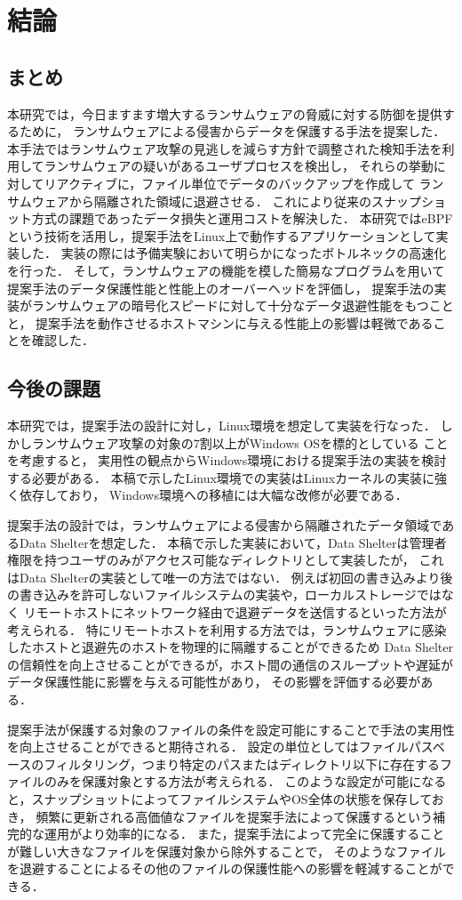 \chapter{結論}
\section{まとめ}
本研究では，今日ますます増大するランサムウェアの脅威に対する防御を提供するために，
ランサムウェアによる侵害からデータを保護する手法を提案した．
本手法ではランサムウェア攻撃の見逃しを減らす方針で調整された検知手法を利用してランサムウェアの疑いがあるユーザプロセスを検出し，
それらの挙動に対してリアクティブに，ファイル単位でデータのバックアップを作成して
ランサムウェアから隔離された領域に退避させる．
これにより従来のスナップショット方式の課題であったデータ損失と運用コストを解決した．
本研究ではeBPFという技術を活用し，提案手法をLinux上で動作するアプリケーションとして実装した．
実装の際には予備実験において明らかになったボトルネックの高速化を行った．
そして，ランサムウェアの機能を模した簡易なプログラムを用いて提案手法のデータ保護性能と性能上のオーバーヘッドを評価し，
提案手法の実装がランサムウェアの暗号化スピードに対して十分なデータ退避性能をもつことと，
提案手法を動作させるホストマシンに与える性能上の影響は軽微であることを確認した．

\section{今後の課題}
本研究では，提案手法の設計に対し，Linux環境を想定して実装を行なった．
しかしランサムウェア攻撃の対象の7割以上がWindows OSを標的としている \cite{trendmicro-report} ことを考慮すると，
実用性の観点からWindows環境における提案手法の実装を検討する必要がある．
本稿で示したLinux環境での実装はLinuxカーネルの実装に強く依存しており，
Windows環境への移植には大幅な改修が必要である．

提案手法の設計では，ランサムウェアによる侵害から隔離されたデータ領域であるData Shelterを想定した．
本稿で示した実装において，Data Shelterは管理者権限を持つユーザのみがアクセス可能なディレクトリとして実装したが，
これはData Shelterの実装として唯一の方法ではない．
例えば初回の書き込みより後の書き込みを許可しないファイルシステムの実装や，ローカルストレージではなく
リモートホストにネットワーク経由で退避データを送信するといった方法が考えられる．
特にリモートホストを利用する方法では，ランサムウェアに感染したホストと退避先のホストを物理的に隔離することができるため
Data Shelterの信頼性を向上させることができるが，ホスト間の通信のスループットや遅延がデータ保護性能に影響を与える可能性があり，
その影響を評価する必要がある．

提案手法が保護する対象のファイルの条件を設定可能にすることで手法の実用性を向上させることができると期待される．
設定の単位としてはファイルパスベースのフィルタリング，つまり特定のパスまたはディレクトリ以下に存在するファイルのみを保護対象とする方法が考えられる．
このような設定が可能になると，スナップショットによってファイルシステムやOS全体の状態を保存しておき，
頻繁に更新される高価値なファイルを提案手法によって保護するという補完的な運用がより効率的になる．
また，提案手法によって完全に保護することが難しい大きなファイルを保護対象から除外することで，
そのようなファイルを退避することによるその他のファイルの保護性能への影響を軽減することができる．
